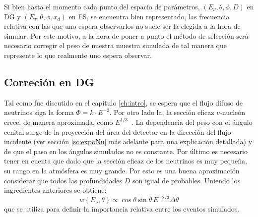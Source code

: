 	Si bien hasta el momento cada punto del espacio de parámetros, $(E_\nu,\theta,\phi,D)$ en DG y $(E_\tau,\theta,\phi,x_d)$ en ES, se encuentra bien representado, las frecuencia relativa con las que uno espera observarlos no suele ser la elegida a la hora de simular.
	Por este motivo, a la hora de poner a punto el método de selección será necesario corregir el peso de nuestra muestra simulada de tal manera que represente lo que realmente uno espera observar.
		
		\subsection{Correción en DG}
		
		Tal como fue discutido en el cap\'itulo \ref{ch:intro}, se espera que el flujo difuso de neutrinos siga la forma $\Phi=k\cdot E^{-2}$. Por otro lado la, la sección eficaz $\nu$-nucleón crece, de manera aproximada, como $E^{1/3}$~\cite{cite:cooper_sarkar}.
		La dependencia del peso con el ángulo cenital surge de la proyección del área del detector en la dirección del flujo incidente (ver sección \ref{sc:expoNu} más adelante para una explicación detallada) y de que el paso en los ángulos simulados no es constante.
		Por último es necesario tener en cuenta que dado que la sección eficaz de los neutrinos es muy pequeña, su rango en la atmósfera es muy grande.
		Por esto es una buena aproximación considerar que todos las profundidades $D$ son igual de probables.
		Uniendo los ingredientes anteriores se obtiene:
		\begin{equation}
		w(E_\nu,\theta) \propto \cos\theta \sin\theta \, E^{-2/3} \Delta\theta
		\end{equation}
		que se utiliza para definir la importancia relativa entre los eventos simulados.
		
